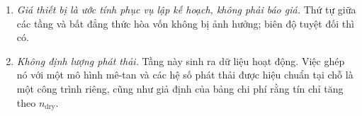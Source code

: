 \begin{enumerate}
suất và năm trạng thái đầu bao được đồng bằng nhưng không vét hết nó. Một thửa ruộng nằm ngoài
$\Theta$ sẽ mất bảo đảm của Mệnh đề~\ref{prop:noalarm} trong bài chính, và đó chính xác là
tình huống mà ngưỡng tỉ lệ cùng phán quyết chờ xác minh tồn tại để hấp thụ.
\item \emph{Giá thiết bị là ước tính phục vụ lập kế hoạch, không phải báo giá.} Thứ tự giữa các
tầng và bất đẳng thức hòa vốn không bị ảnh hưởng; biên độ tuyệt đối thì có.
\item \emph{Không định lượng phát thải.} Tầng này sinh ra dữ liệu hoạt động. Việc ghép nó với
một mô hình mê-tan và các hệ số phát thải được hiệu chuẩn tại chỗ là một công trình riêng,
cũng như giả định của bảng chi phí rằng tín chỉ tăng theo $n_{\mathrm{dry}}$.
\end{enumerate}
